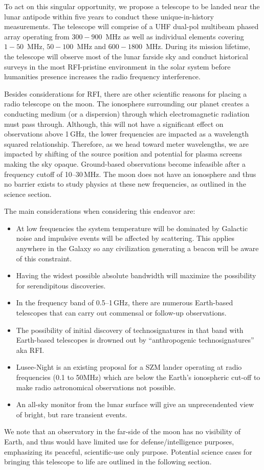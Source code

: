 To act on this singular opportunity, we propose a telescope to be landed near the lunar antipode within five years to conduct these unique-in-history measurements. The telescope will comprise of a UHF dual-pol multibeam phased array operating from $300-900$~MHz as well as individual elements covering $1-50$~MHz, $50-100$~MHz and $600-1800$~MHz. During its mission lifetime, the telescope will observe most of the lunar farside sky and conduct historical surveys in the most RFI-pristine environment in the solar system before humanities presence increases the radio frequency interference.

Besides considerations for RFI, there are other scientific reasons for placing a radio telescope on the moon. The ionosphere surrounding our planet creates a conducting medium (or a dispersion) through which electromagnetic radiation must pass through. Although, this will not have a significant effect on observations above 1\,GHz, the lower frequencies are impacted as a wavelength squared relationship. Therefore, as we head toward meter wavelengths, we are impacted by shifting of the source position and potential for plasma screens making the sky opaque. Ground-based observations become infeasible after a frequency cutoff of 10--30\,MHz. The moon does not have an ionosphere and thus no barrier exists to study physics at these new frequencies, as outlined in the science section.

The main considerations when considering this endeavor are:
\begin{itemize}
    \item At low frequencies the system temperature will be dominated by Galactic noise and impulsive events will be affected by scattering.  This applies anywhere in the Galaxy so any civilization generating a beacon will be aware of this constraint.
    \item Having the widest possible absolute bandwidth will maximize the possibility for serendipitous discoveries.
    \item In the frequency band of 0.5--1\,GHz, there are numerous Earth-based telescopes that can carry out commensal or follow-up observations.
    \item The possibility of initial discovery of technosignatures in that band with Earth-based telescopes is drowned out by ``anthropogenic technosignatures” aka RFI.
    \item Lusee-Night is an existing proposal for a SZM lander operating at radio frequencies (0.1 to 50MHz) which are below the Earth's ionospheric cut-off to make radio astronomical observations not possible. 
    \item An all-sky monitor from the lunar surface will give an unprecendented view of bright, but rare transient events.
\end{itemize}

We note that an observatory in the far-side of the moon has no visibility of Earth, and thus would have limited use for defense/intelligence purposes, emphasizing its peaceful, scientific-use only purpose. Potential science cases for bringing this telescope to life are outlined in the following section.